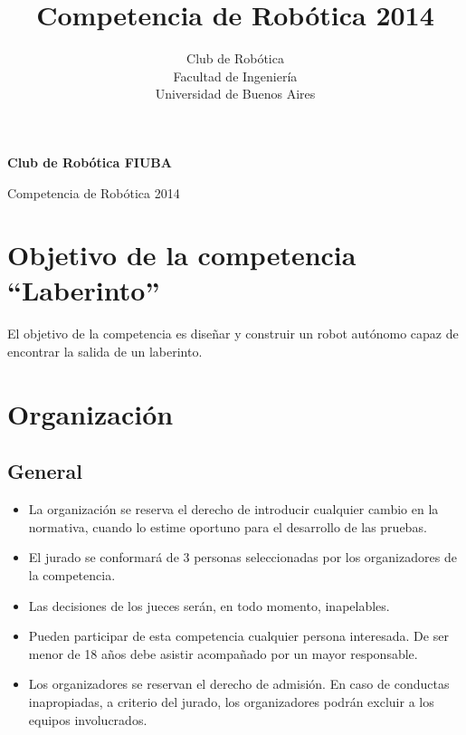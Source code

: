 \documentclass[a4paper,11pt]{article}
\author{Club de Robótica \\ Facultad de Ingeniería \\ Universidad de Buenos Aires}
\title{Competencia de Robótica 2014}
\begin{document}
\begin{center}
  {\Huge \textbf{Club de Robótica FIUBA}}
  \vspace{0.5cm}

  {\huge Competencia de Robótica 2014}
\end{center}

\section*{Objetivo de la competencia ``Laberinto''}
El objetivo de la competencia es diseñar y construir un robot autónomo capaz de encontrar la salida de un laberinto.
\section*{Organización}
\subsection*{General}
\begin{itemize}
  \item La organización se reserva el derecho de introducir cualquier cambio en la normativa, cuando lo estime oportuno para el desarrollo de las pruebas.
  \item El jurado se conformará de 3 personas seleccionadas por los organizadores de la competencia.
  \item Las decisiones de los jueces serán, en todo momento, inapelables.
  \item Pueden participar de esta competencia cualquier persona interesada. De ser menor de 18 años debe asistir acompañado por un mayor responsable.
  \item Los organizadores se reservan el derecho de admisión. En caso de conductas inapropiadas, a criterio del jurado, los organizadores podrán excluir a los equipos involucrados.
\end{itemize}
\end{document}
